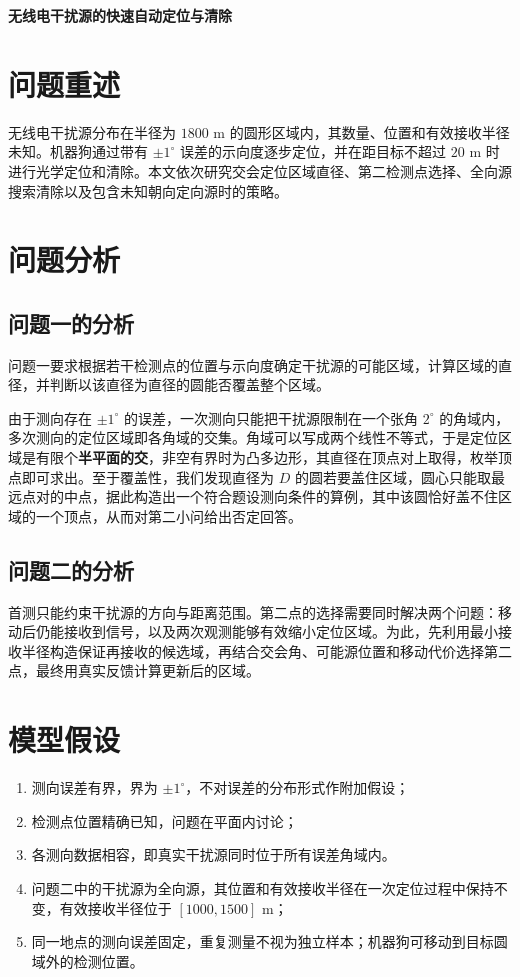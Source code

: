 \documentclass[UTF8,a4paper,zihao=-4,fontset=fandol]{ctexart}
\begin{document}
\setcounter{page}{1}
\begin{center}{\LARGE\bfseries 无线电干扰源的快速自动定位与清除\par}\end{center}
\begin{abstract}
\noindent 摘要待四问模型与正式测试结果齐备后统一撰写。
\par\medskip\noindent\textbf{关键词：}交会定位；最小包围圆；主动测向；干扰源清除
\end{abstract}
\clearpage
\section{问题重述}
无线电干扰源分布在半径为 $1800$ m 的圆形区域内，其数量、位置和有效接收半径未知。机器狗通过带有 $\pm1^\circ$ 误差的示向度逐步定位，并在距目标不超过 $20$ m 时进行光学定位和清除。本文依次研究交会定位区域直径、第二检测点选择、全向源搜索清除以及包含未知朝向定向源时的策略。

\section{问题分析}
\subsection{问题一的分析}
问题一要求根据若干检测点的位置与示向度确定干扰源的可能区域，计算区域的直径，并判断以该直径为直径的圆能否覆盖整个区域。

由于测向存在 $\pm 1^\circ$ 的误差，一次测向只能把干扰源限制在一个张角 $2^\circ$ 的角域内，多次测向的定位区域即各角域的交集。角域可以写成两个线性不等式，于是定位区域是有限个\textbf{半平面的交}，非空有界时为凸多边形，其直径在顶点对上取得，枚举顶点即可求出。至于覆盖性，我们发现直径为 $D$ 的圆若要盖住区域，圆心只能取最远点对的中点，据此构造出一个符合题设测向条件的算例，其中该圆恰好盖不住区域的一个顶点，从而对第二小问给出否定回答。

\subsection{问题二的分析}
首测只能约束干扰源的方向与距离范围。第二点的选择需要同时解决两个问题：移动后仍能接收到信号，以及两次观测能够有效缩小定位区域。为此，先利用最小接收半径构造保证再接收的候选域，再结合交会角、可能源位置和移动代价选择第二点，最终用真实反馈计算更新后的区域。

\section{模型假设}
\begin{enumerate}
\item 测向误差有界，界为 $\pm 1^\circ$，不对误差的分布形式作附加假设；
\item 检测点位置精确已知，问题在平面内讨论；
\item 各测向数据相容，即真实干扰源同时位于所有误差角域内。
\item 问题二中的干扰源为全向源，其位置和有效接收半径在一次定位过程中保持不变，有效接收半径位于 $[1000,1500]$ m；
\item 同一地点的测向误差固定，重复测量不视为独立样本；机器狗可移动到目标圆域外的检测位置。
\end{enumerate}
\end{document}
